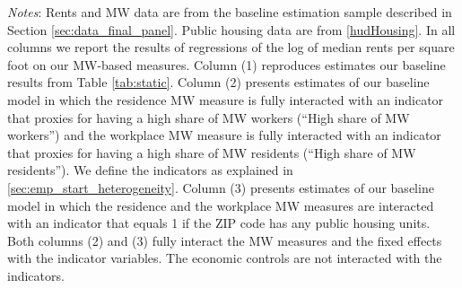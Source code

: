 \begin{table}[hbt!]
    \begin{minipage}{.95\textwidth} \footnotesize
        \vspace{2mm}
        \textit{Notes}: 
        Rents and MW data are from the baseline estimation sample described in Section 
        \ref{sec:data_final_panel}.
        Public housing data are from \ref{hudHousing}.
        In all columns we report the results of regressions of the log of median rents 
        per square foot on our MW-based measures.
        Column (1) reproduces estimates our baseline results from Table \ref{tab:static}.
        Column (2) presents estimates of our baseline model in which the residence MW 
        measure is fully interacted with an indicator that proxies for having a high share 
        of MW workers (``High share of MW workers'') and the workplace MW measure is 
        fully interacted with an indicator that proxies for having a high share of MW 
        residents (``High share of MW residents'').
        We define the indicators as explained in \ref{sec:emp_start_heterogeneity}.
        Column (3) presents estimates of our baseline model in which the residence and 
        the workplace MW measures are interacted with an indicator that equals 1 if 
        the ZIP code has any public housing units.
        Both columns (2) and (3) fully interact the MW measures and the fixed effects
        with the indicator variables. The economic controls are not interacted with 
        the indicators.
    \end{minipage}
\end{table}
